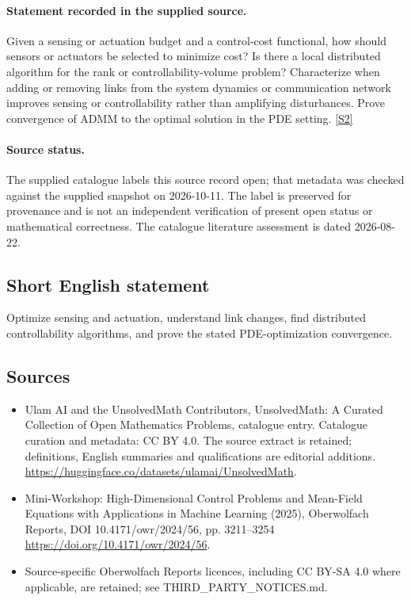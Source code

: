 \documentclass[11pt]{article}
\begin{document}
\paragraph{Statement recorded in the supplied source.}
Given a sensing or actuation budget and a control-cost functional, how should sensors or actuators be selected to minimize cost? Is there a local distributed algorithm for the rank or controllability-volume problem? Characterize when adding or removing links from the system dynamics or communication network improves sensing or controllability rather than amplifying disturbances. Prove convergence of ADMM to the optimal solution in the PDE setting. \href{https://doi.org/10.4171/owr/2024/56}{[S2]}
\paragraph{Source status.}
The supplied catalogue labels this source record open; that metadata was checked against the supplied snapshot on 2026-10-11. The label is preserved for provenance and is not an independent verification of present open status or mathematical correctness. The catalogue literature assessment is dated 2026-08-22.
\subsection{Short English statement}
Optimize sensing and actuation, understand link changes, find distributed controllability algorithms, and prove the stated PDE-optimization convergence.
\subsection{Sources}
\begin{itemize}
\item[S1] Ulam AI and the UnsolvedMath Contributors, UnsolvedMath: A Curated Collection of Open Mathematics Problems, catalogue entry. Catalogue curation and metadata: CC BY 4.0. The source extract is retained; definitions, English summaries and qualifications are editorial additions.
\url{https://huggingface.co/datasets/ulamai/UnsolvedMath}.
\item[S2] Mini-Workshop: High-Dimensional Control Problems and Mean-Field Equations with Applications in Machine Learning (2025), Oberwolfach Reports, DOI 10.4171/owr/2024/56, pp. 3211--3254
\url{https://doi.org/10.4171/owr/2024/56}.
\item Source-specific Oberwolfach Reports licences, including CC BY-SA 4.0 where applicable, are retained; see THIRD\_PARTY\_NOTICES.md.
\end{itemize}
\end{document}
